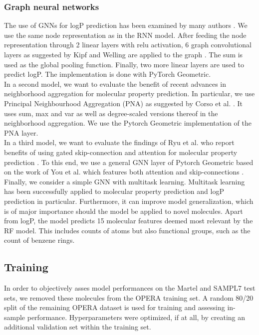 \documentclass{article}
\theoremstyle{definition}
\theoremstyle{remark}
\begin{document}
\subsubsection{Graph neural networks}

The use of GNNs for logP prediction has been examined by many authors \cite{wieder2020compact}. We use the same node representation as in the RNN model. After feeding the node representation through 2 linear layers with relu activation, 6 graph convolutional layers as suggested by Kipf and Welling are applied to the graph \cite{welling2016semi}. The sum is used as the global pooling function. Finally, two more linear layers are used to predict logP. The implementation is done with PyTorch Geometric. \\

In a second model, we want to evaluate the benefit of recent advances in neighborhood aggregation for molecular property prediction. In particular, we use Principal Neighbourhood Aggregation (PNA) as suggested by Corso et al. \cite{corso2020principal}. It uses sum, max and var as well as degree-scaled versions thereof in the neighborhood aggregation. We use the Pytorch Geometric implementation of the PNA layer.\\

In a third model, we want to evaluate the findings of Ryu et al. who report benefits of using gated skip-connection and attention for molecular property prediction \cite{ryu2018deeply}. To this end, we use a general GNN layer of Pytorch Geometric based on the work of You et al. which features both attention and skip-connections \cite{you2020design}. \\

Finally, we consider a simple GNN with multitask learning. Multitask learning has been successfully applied to molecular property prediction and logP prediction in particular. Furthermore, it can improve model generalization, which is of major importance should the model be applied to novel molecules. Apart from logP, the model predicts 15 molecular features deemed most relevant by the RF model. This includes counts of atoms but also functional groups, such as the count of benzene rings. \\

\subsection{Training}

In order to objectively asses model performances on the Martel and SAMPL7 test sets, we removed these molecules from the OPERA training set. A random 80/20 split of the remaining OPERA dataset is used for training and assessing in-sample performance. Hyperparameters were optimized, if at all, by creating an additional validation set within the training set. \\
\end{document}

